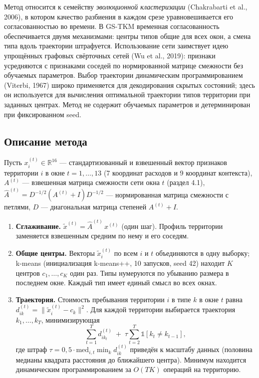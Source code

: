 \documentclass[11pt,a4paper]{article}
\providecommand{\tightlist}{\setlength{\itemsep}{1pt}\setlength{\parskip}{0pt}}
\begin{document}
Метод относится к семейству \emph{эволюционной кластеризации} (Chakrabarti et al., 2006), в котором качество разбиения в каждом срезе уравновешивается его согласованностью во времени. В GS-TKM временная согласованность обеспечивается двумя механизмами: центры типов общие для всех окон, а смена типа вдоль траектории штрафуется. Использование сети заимствует идею упрощённых графовых свёрточных сетей (Wu et al., 2019): признаки усредняются с признаками соседей по нормированной матрице смежности без обучаемых параметров. Выбор траектории динамическим программированием (Viterbi, 1967) широко применяется для декодирования скрытых состояний; здесь он используется для вычисления оптимальной траектории типов территории при заданных центрах. Метод не содержит обучаемых параметров и детерминирован при фиксированном seed.

\subsection{Описание метода}\label{ux43eux43fux438ux441ux430ux43dux438ux435-ux43cux435ux442ux43eux434ux430}

Пусть \(x_i^{(t)} \in \mathbb{R}^{16}\) --- стандартизованный и взвешенный вектор признаков территории \(i\) в окне \(t = 1,\dots,13\) (7 координат расходов и 9 координат контекста), \(A^{(t)}\) --- взвешенная матрица смежности сети окна \(t\) (раздел 4.1), \(\hat A^{(t)} = D^{-1/2}(A^{(t)} + I)D^{-1/2}\) --- нормированная матрица смежности с петлями, \(D\) --- диагональная матрица степеней \(A^{(t)} + I\).

\begin{enumerate}
\def\labelenumi{\arabic{enumi}.}
\tightlist
\item
  \textbf{Сглаживание.} \(\tilde x^{(t)} = \hat A^{(t)}\, x^{(t)}\) (один шаг). Профиль территории заменяется взвешенным средним по нему и его соседям.
\item
  \textbf{Общие центры.} Векторы \(\tilde x_i^{(t)}\) по всем \(i\) и \(t\) объединяются в одну выборку; k-means (инициализация k-means++, 10 запусков, seed 42) находит \(K\) центров \(c_1,\dots,c_K\) один раз. Типы нумеруются по убыванию размера в последнем окне. Каждый тип имеет единый смысл во всех окнах.
\item
  \textbf{Траектория.} Стоимость пребывания территории \(i\) в типе \(k\) в окне \(t\) равна \(d_{ik}^{(t)} = \lVert \tilde x_i^{(t)} - c_k \rVert^2\). Для каждой территории выбирается траектория \(k_1,\dots,k_T\), минимизирующая
  \[\sum_{t=1}^{T} d_{i k_t}^{(t)} \;+\; \tau \sum_{t=2}^{T} \mathbb{1}[k_t \ne k_{t-1}],\]
  где штраф \(\tau = 0{,}5 \cdot \mathrm{med}_{i,t} \min_k d_{ik}^{(t)}\) приведён к масштабу данных (половина медианы квадрата расстояния до ближайшего центра). Минимум находится динамическим программированием за \(O(TK)\) операций на территорию.
\end{enumerate}
\end{document}
